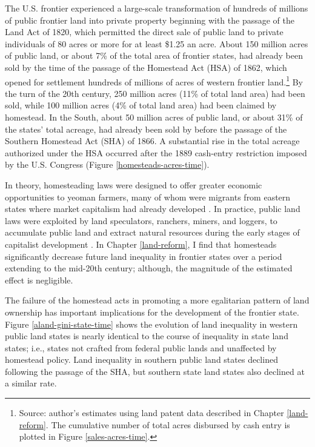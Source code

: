 The U.S. frontier experienced a large-scale transformation of hundreds of millions of public frontier land into private property beginning with the passage of the Land Act of 1820, which permitted the direct sale of public land to private individuals of 80 acres or more for at least \$1.25 an acre. About 150 million acres of public land, or about 7\% of the total area of frontier states, had already been sold by the time of the passage of the Homestead Act (HSA) of 1862, which opened for settlement hundreds of millions of acres of western frontier land.\footnote{Source: author's estimates using land patent data described in Chapter \ref{land-reform}. The cumulative number of total acres disbursed by cash entry is plotted in Figure \ref{sales-acres-time}.} By the turn of the 20th century, 250 million acres (11\% of total land area) had been sold, while 100 million acres (4\% of total land area) had been claimed by homestead. In the South, about 50 million acres of public land, or about 31\% of the states' total acreage, had already been sold by before the passage of the Southern Homestead Act (SHA) of 1866. A substantial rise in the total acreage authorized under the HSA occurred after the 1889 cash-entry restriction imposed by the U.S. Congress (Figure \ref{homesteads-acres-time}).

In theory, homesteading laws were designed to offer greater economic opportunities to yeoman farmers, many of whom were migrants from eastern states where market capitalism had already developed \citep{kulikoff1992agrarian}. In practice, public land laws were exploited by land speculators, ranchers, miners, and loggers, to accumulate public land and extract natural resources during the early stages of capitalist development \citep{murtazashvili2013political}. In Chapter \ref{land-reform}, I find that homesteads significantly decrease future land inequality in frontier states over a period extending to the mid-20th century; although, the magnitude of the estimated effect is negligible.

The failure of the homestead acts in promoting a more egalitarian pattern of land ownership has important implications for the development of the frontier state. Figure \ref{aland-gini-state-time} shows the evolution of land inequality in western public land states is nearly identical to the course of inequality in state land states; i.e., states not crafted from federal public lands and unaffected by homestead policy. Land inequality in southern public land states declined following the passage of the SHA, but southern state land states also declined at a similar rate. 

